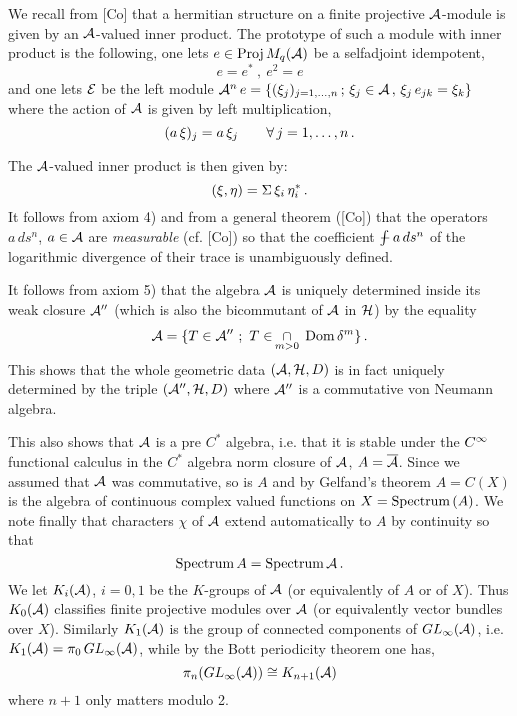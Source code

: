 \medskip

\noindent We recall from [Co] that a hermitian structure on
a finite projective ${\cal A}$-module is given by an
${\cal A}$-valued inner product. The prototype of such a
module with inner product is the following, one lets
$e\in \mathop{\rm Proj}\nolimits M_q ({\cal A})$ be a selfadjoint idempotent,
$$
e=e^* \ , \ e^2 =e
$$
and one lets ${\cal E}$ be the left module ${\cal A}^n \, e = \{
(\xi_j)_{j=1,\ldots ,n} \, ; \, \xi_j \in {\cal A} \, , \,
\xi_j \, e_{jk} = \xi_k \}$ where the action of ${\cal A}$ is
given by left multiplication,
$$
(a \, \xi)_j = a \, \xi_j \qquad \forall \, j=1,\ldots ,n \,
.
$$

\noindent The ${\cal A}$-valued inner product is then given by:
$$
(\xi ,\eta) = \Sigma \, \xi_i \, \eta_i^* \, .
$$
It follows from axiom 4) and from a general theorem ([Co])
that the operators $a \, ds^n$, $a \in {\cal A}$ are {\it
measurable} (cf. [Co]) so that the coefficient $\int \!\!\!\!\! -
\, a \, ds^n$ of the logarithmic divergence of their trace
is unambiguously defined.

\smallskip

\noindent It follows from axiom 5) that the algebra ${\cal A}$
is uniquely determined inside its weak closure ${\cal A}''$
(which is also the bicommutant of ${\cal A}$ in ${\cal H}$) by the
equality
$$
\Ac = \{ T\in \Ac'' \ ; \ T\in \, \build \cap_{m>0}^{} \,
\Dom \d^m \} \, .
$$
This shows that the whole geometric data $({\cal A} ,{\cal H} ,D)$
is in fact uniquely determined by the triple $({\cal A}'' ,{\cal H}
,D)$ where ${\cal A}''$ is a commutative von Neumann algebra.

\smallskip

\noindent This also shows that ${\cal A}$ is a pre $C^*$
algebra, i.e. that it is stable under the $C^{\infty}$
functional calculus in the $C^*$ algebra norm closure of
${\cal A}$, $A=\overline{{\cal A}}$. Since we assumed that ${\cal A}$ was
commutative, so is $A$ and by Gelfand's theorem $A =
C(X)$ is the algebra of continuous complex valued
functions on $X = \hbox{Spectrum} \, (A)$. We note
finally that characters $\chi$ of ${\cal A}$ extend
automatically to $A$ by continuity so that
$$
\hbox{Spectrum} \, A = \hbox{Spectrum} \, {\cal A} \, .
$$
We let $K_i ({\cal A})$, $i=0,1$ be the $K$-groups of ${\cal A}$
(or equivalently of $A$ or of $X$). Thus $K_0 ({\cal A})$
classifies finite projective modules over ${\cal A}$ (or
equivalently vector bundles over $X$). Similarly $K_1
({\cal A})$ is the group of connected components of $GL_{\infty}
({\cal A})$, i.e. $K_1 ({\cal A}) = \pi_0 \, GL_{\infty} ({\cal A})$,
while by the Bott periodicity theorem one has,
$$
\pi_n (GL_{\infty} ({\cal A})) \cong K_{n+1} ({\cal A})
$$
where $n+1$ only matters modulo 2.


